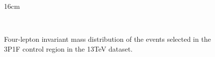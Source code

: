 \begin{figure}[htbp]{16cm}
	\caption{Four-lepton invariant mass distribution of the events selected in the 3P1F control region in the 13TeV dataset.}
	\centering
	\\

\end{figure}
